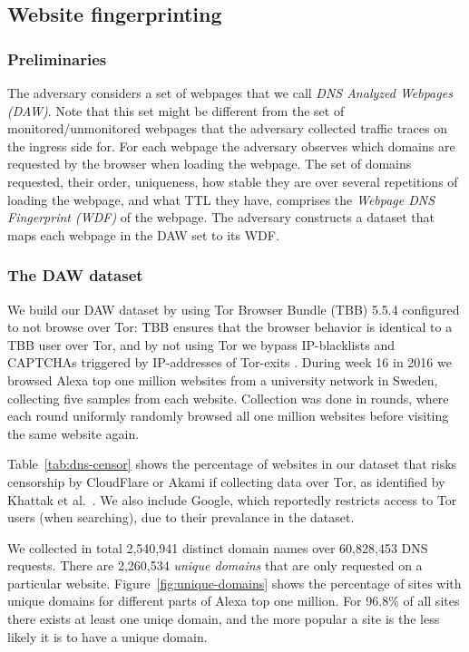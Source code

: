 \subsection{Website fingerprinting}

\subsubsection{Preliminaries}
The adversary considers a set of webpages that we call \emph{DNS
Analyzed Webpages (DAW)}. Note that this set might be different from the
set of monitored/unmonitored webpages that the adversary collected
traffic traces on the ingress side for.
For each webpage the adversary observes which domains are requested by
the browser when loading the webpage. The set of domains requested,
their order, uniqueness, how stable they are over several repetitions of
loading the webpage, and what TTL they have, comprises the
\emph{Webpage DNS Fingerprint (WDF)} of the webpage.
The adversary constructs a dataset that maps each webpage in the DAW set
to its WDF.

\subsubsection{The DAW dataset}
We build our DAW dataset by using Tor Browser Bundle (TBB) 5.5.4
configured to not browse over Tor: TBB ensures that the browser behavior is
identical to a TBB user over Tor, and by not using Tor we bypass IP-blacklists
and CAPTCHAs triggered by IP-addresses of Tor-exits \cite{Khattak2016a}.
During week 16 in 2016 we browsed Alexa top one million websites from a
university network in Sweden, collecting five samples from each website.
Collection was done in rounds, where each round uniformly randomly browsed all one
million websites before visiting the same website again.

Table~\ref{tab:dns-censor} shows the percentage of websites in our dataset that
risks censorship by CloudFlare or Akami if collecting data over Tor, as
identified by Khattak et al.~\cite{Khattak2016a}. We also include Google, which
reportedly restricts access to Tor users (when searching), due to
their prevalance in the dataset.

We collected in total 2,540,941 distinct domain names over 60,828,453 DNS requests.
There are 2,260,534 \emph {unique domains} that are only requested on a
particular website. Figure~\ref{fig:unique-domains} shows the percentage of sites
with unique domains for different parts of Alexa top one million.
For 96.8\% of all sites there exists at least one uniqe domain, and the more popular
a site is the less likely it is to have a unique domain.

